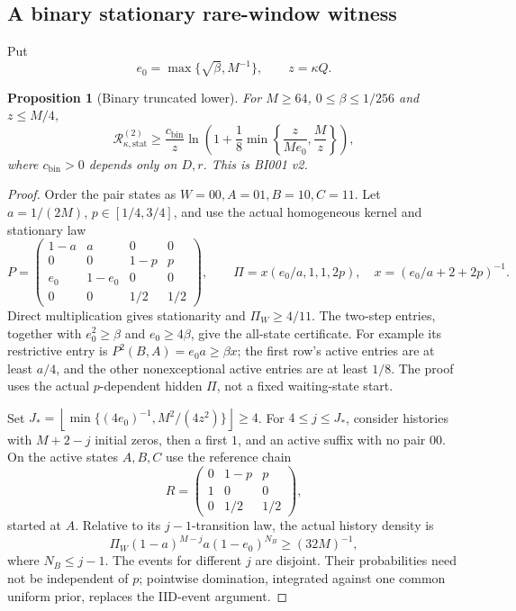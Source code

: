 \documentclass[11pt,letterpaper]{article}
\newtheorem{proposition}[theorem]{Proposition}
\theoremstyle{definition}\newtheorem{definition}[theorem]{Definition}
\theoremstyle{remark}\newtheorem{remark}[theorem]{Remark}
\newcommand{\floor}[1]{\left\lfloor #1\right\rfloor}
\newcommand{\Risk}{\mathcal{R}}
\newcommand{\unit}[1]{\textsf{#1}}
\begin{document}
\subsection{A binary stationary rare-window witness}
Put
\[
 e_0=\max\{\sqrt\beta,M^{-1}\},\qquad z=\kappa Q.
\]
\begin{proposition}[Binary truncated lower]\label{prop:binarylower}
For $M\ge64$, $0\le\beta\le1/256$ and $z\le M/4$,
\begin{equation}\label{eq:binarylower}
 \Risk_{\kappa,\mathrm{stat}}^{(2)}
 \ge\frac{c_{\mathrm{bin}}}{z}
 \ln\left(1+\frac18\min\left\{\frac{z}{Me_0},\frac Mz\right\}\right),
\end{equation}
where $c_{\mathrm{bin}}>0$ depends only on $D,r$. This is \unit{BI001 v2}.
\end{proposition}
\begin{proof}
Order the pair states as $W=00,A=01,B=10,C=11$. Let $a=1/(2M)$, $p\in[1/4,3/4]$, and use the actual homogeneous kernel and stationary law
\[
 P=\begin{pmatrix}
 1-a&a&0&0\\
 0&0&1-p&p\\
 e_0&1-e_0&0&0\\
 0&0&1/2&1/2
 \end{pmatrix},\qquad
 \Pi=x(e_0/a,1,1,2p),\quad x=(e_0/a+2+2p)^{-1}.
\]
Direct multiplication gives stationarity and $\Pi_W\ge4/11$. The two-step entries, together with $e_0^2\ge\beta$ and $e_0\ge4\beta$, give the all-state certificate. For example its restrictive entry is
$P^2(B,A)=e_0a\ge\beta x$; the first row's active entries are at least $a/4$, and the other nonexceptional active entries are at least $1/8$. The proof uses the actual $p$-dependent hidden $\Pi$, not a fixed waiting-state start.

Set $J_*=\floor{\min\{(4e_0)^{-1},M^2/(4z^2)\}}\ge4$.
For $4\le j\le J_*$, consider histories with $M+2-j$ initial zeros, then a first $1$, and an active suffix with no pair $00$. On the active states $A,B,C$ use the reference chain
\[
 R=\begin{pmatrix}0&1-p&p\\1&0&0\\0&1/2&1/2\end{pmatrix},
\]
started at $A$. Relative to its $j-1$-transition law, the actual history density is
\[
 \Pi_W(1-a)^{M-j}a(1-e_0)^{N_B}\ge(32M)^{-1},
\]
where $N_B\le j-1$. The events for different $j$ are disjoint. Their probabilities need not be independent of $p$; pointwise domination, integrated against one common uniform prior, replaces the IID-event argument.


\end{proof}
\end{document}
